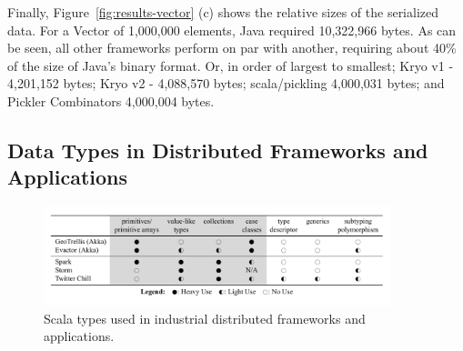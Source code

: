 \documentclass[preprint,10pt]{sigplanconf}
\theoremstyle{definition}
\theoremstyle{definition}
\begin{document}
Finally, Figure~\ref{fig:results-vector} (c) shows the relative sizes of the serialized data. For a Vector of 1,000,000 elements, Java required 10,322,966 bytes. As can be seen, all other frameworks perform on par with another, requiring about 40\% of the size of Java's binary format. Or, in order of largest to smallest; Kryo v1 - 4,201,152 bytes; Kryo v2 - 4,088,570 bytes; scala/pickling 4,000,031 bytes; and Pickler Combinators 4,000,004 bytes.

\subsection{Data Types in Distributed Frameworks and Applications}
\label{sec:data-types-in-distributed-applications}

\begin{figure}[ht!]
 \centering
 \includegraphics[width=0.9\textwidth]{application-table.pdf}
 \vspace{-1em}
 \caption{Scala types used in industrial distributed frameworks and applications.}
 \label{fig:application-table}
\end{figure}
\end{document}
